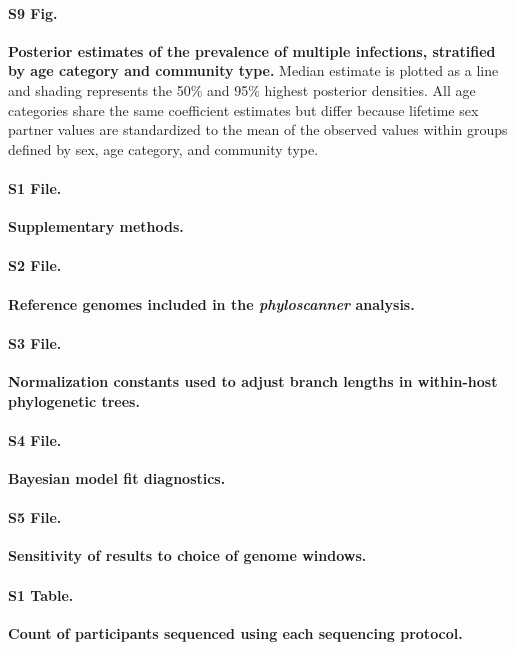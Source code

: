 \documentclass[10pt,letterpaper]{article}
\begin{document}
\paragraph*{S9 Fig.}
\label{empirical_sexpever_men_prob_mi}
{\bf Posterior estimates of the prevalence of multiple infections, stratified by age category and community type.} Median estimate is plotted as a line and shading represents the 50\% and 95\% highest posterior densities. All age categories share the same coefficient estimates but differ because lifetime sex partner values are standardized to the mean of the observed values within groups defined by sex, age category, and community type.
\newpage

\paragraph*{S1 File.}
\label{supp_methods}
{\bf Supplementary methods.}

\paragraph*{S2 File.}
\label{reference_genomes}
{\bf Reference genomes included in the \textit{phyloscanner} analysis.}

\paragraph*{S3 File.}
\label{normalization_constants}
{\bf Normalization constants used to adjust branch lengths in within-host phylogenetic trees.} 

\paragraph*{S4 File.}
\label{model_diagnostics}
{\bf Bayesian model fit diagnostics.}

\paragraph*{S5 File.}
\label{genome_window_sensitivity}
{\bf Sensitivity of results to choice of genome windows.}

\paragraph*{S1 Table.}
\label{seq_tech_table}
 {\bf Count of participants sequenced using each sequencing protocol.}
\end{document}
